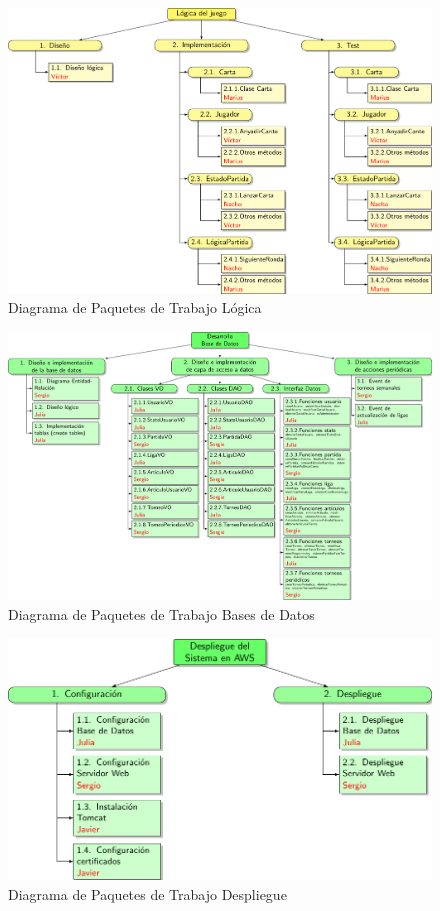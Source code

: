\begin{figure}[H]
		\hspace{-1cm}
		\includegraphics[scale=0.8]{figuras/edtLogica.pdf}
		\caption{Diagrama de Paquetes de Trabajo Lógica}
	\end{figure}

\begin{figure}[H]
		\hspace{-2cm}
		\includegraphics[scale=0.8]{figuras/edtBasesDatos.pdf}
		\caption{Diagrama de Paquetes de Trabajo Bases de Datos}
	\end{figure}

\begin{figure}[H]
		\centering
		\includegraphics[scale=0.8]{figuras/edtDespliegue.pdf}
		\caption{Diagrama de Paquetes de Trabajo Despliegue}
	\end{figure}

